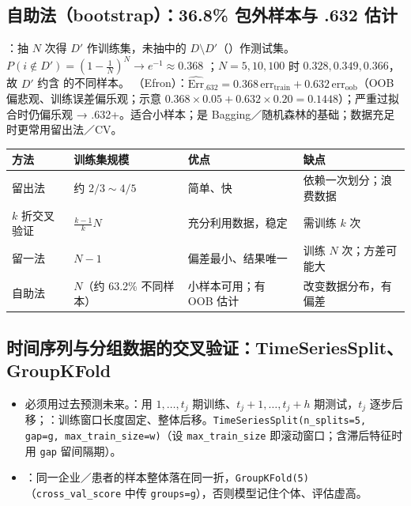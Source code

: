 \subsection{自助法（bootstrap）：36.8\% 包外样本与 .632 估计}
：抽 $N$ 次得 $D'$ 作训练集，未抽中的 $D\setminus D'$（）作测试集。
$P(i\notin D')=(1-\frac1N)^N\to e^{-1}\approx0.368$ ；$N=5,10,100$ 时 $0.328,0.349,0.366$，故 $D'$ 约含  的不同样本。
（Efron）：$\widehat{\mathrm{Err}}_{.632}=0.368\,\mathrm{err}_{\text{train}}+0.632\,\mathrm{err}_{\text{oob}}$（OOB 偏悲观、训练误差偏乐观；示意 $0.368\times0.05+0.632\times0.20=0.1448$）；严重过拟合时仍偏乐观 → .632+。适合小样本；是 Bagging／随机森林的基础；数据充足时更常用留出法／CV。
\begin{center}\small\renewcommand{\arraystretch}{1.1}
\begin{tabularx}{\linewidth}{@{}p{2.3cm}p{3.6cm}LL@{}}
\toprule
方法 & 训练集规模 & 优点 & 缺点 \\
\midrule
留出法 & 约 $2/3\sim4/5$ & 简单、快 & 依赖一次划分；浪费数据 \\
$k$ 折交叉验证 & $\frac{k-1}{k}N$ & 充分利用数据，稳定 & 需训练 $k$ 次 \\
留一法 & $N-1$ & 偏差最小、结果唯一 & 训练 $N$ 次；方差可能大 \\
自助法 & $N$（约 63.2\% 不同样本）& 小样本可用；有 OOB 估计 & 改变数据分布，有偏差 \\
\bottomrule
\end{tabularx}
\end{center}

\subsection{时间序列与分组数据的交叉验证：TimeSeriesSplit、GroupKFold}
\begin{itemize}
\item {}必须用过去预测未来。：用 $1,\dots,t_j$ 期训练、$t_j+1,\dots,t_j+h$ 期测试，$t_j$ 逐步后移；：训练窗口长度固定、整体后移。\texttt{TimeSeriesSplit(n\_splits=5, gap=g, max\_train\_size=w)}（设 \texttt{max\_train\_size} 即滚动窗口；含滞后特征时用 \texttt{gap} 留间隔期）。
\item {}：同一企业／患者的样本整体落在同一折，\texttt{GroupKFold(5)}（\texttt{cross\_val\_score} 中传 \texttt{groups=g}），否则模型记住个体、评估虚高。
\end{itemize}

